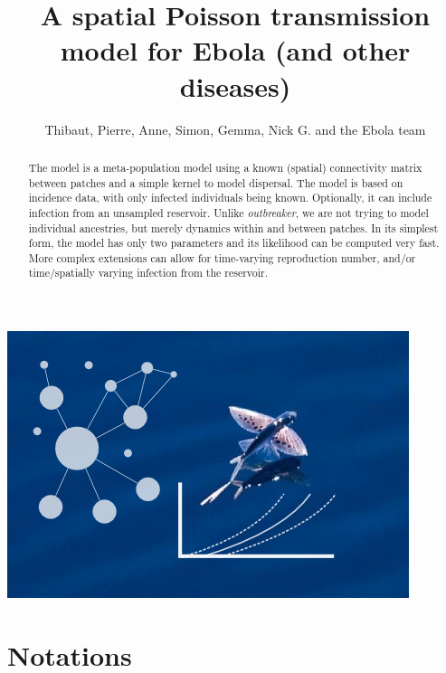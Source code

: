 \documentclass[a4paper,11pt]{article}
\title{A spatial Poisson transmission model for Ebola (and other diseases)}
\author{Thibaut, Pierre, Anne, Simon, Gemma, Nick G. and the Ebola team}
\begin{document}
\maketitle

\begin{center}
\includegraphics{figs/spatialPoisson} 
\end{center}

\begin{abstract}
The model is a meta-population model using a known (spatial) connectivity matrix between patches and a simple kernel to model dispersal. 
The model is based on incidence data, with only infected individuals being 
known.
Optionally, it can include infection from an unsampled reservoir.
Unlike \textit{outbreaker}, we are not trying to model individual ancestries, 
but merely dynamics within and between patches.
In its simplest form, the model has only two parameters and its likelihood can 
be computed very fast.
More complex extensions can allow for time-varying reproduction number, and/or 
time/spatially varying infection from the reservoir.
\end{abstract}

\newpage
\section{Notations}
\end{document}
